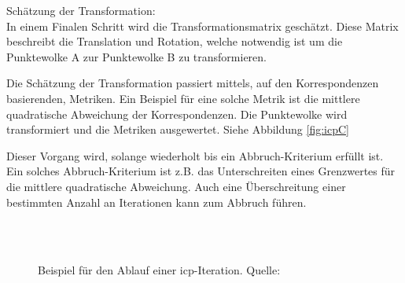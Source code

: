 Schätzung der Transformation: \\
In einem Finalen Schritt wird die Transformationsmatrix geschätzt.
Diese Matrix beschreibt die Translation und Rotation, 
welche notwendig ist um die Punktewolke A zur Punktewolke B zu transformieren.

Die Schätzung der Transformation passiert mittels, auf den Korrespondenzen basierenden, Metriken.
Ein Beispiel für eine solche Metrik ist die mittlere quadratische Abweichung der Korrespondenzen.
Die Punktewolke wird transformiert und die Metriken ausgewertet.
Siehe Abbildung \ref{fig:icpC}

Dieser Vorgang wird, solange wiederholt bis ein Abbruch-Kriterium erfüllt ist.
Ein solches Abbruch-Kriterium ist z.B. das Unterschreiten eines Grenzwertes für die mittlere quadratische Abweichung.
Auch eine Überschreitung einer bestimmten Anzahl an Iterationen kann zum Abbruch führen.

\begin{figure}[H]
     \\
     \\
    \caption{Beispiel für den Ablauf einer \acf{icp}-Iteration. Quelle: \cite[ch. 3]{icp2015}}
\end{figure}

